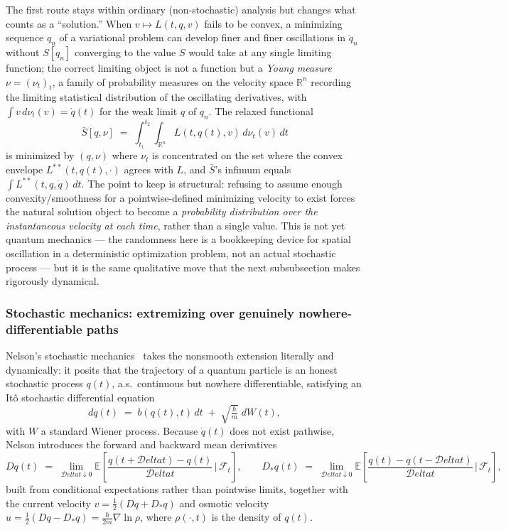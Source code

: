 The first route stays within ordinary (non-stochastic) analysis but changes
what counts as a ``solution.'' When $v\mapsto L(t,q,v)$ fails to be convex, a
minimizing sequence $q_n$ of a variational problem can develop finer and finer
oscillations in $\dot q_n$ without $S[q_n]$ converging to the value $S$ would
take at any single limiting function; the correct limiting object is not a
function but a \emph{Young measure} $\nu=(\nu_t)_{t}$, a family of probability
measures on the velocity space $\mathbb{R}^n$ recording the limiting
statistical distribution of the oscillating derivatives, with $\int
v\,d\nu_t(v)=\dot q(t)$ for the weak limit $q$ of $q_n$. The relaxed functional
\[
\bar S[q,\nu] \;=\; \int_{t_1}^{t_2}\!\!
\int_{\mathbb{R}^n} L(t,q(t),v)\, d\nu_t(v)\, dt
\]
is minimized by $(q,\nu)$ where $\nu_t$ is concentrated on the set where the
convex envelope $L^{\ast\ast}(t,q(t),\cdot)$ agrees with $L$, and $\bar S$'s
infimum equals $\int L^{\ast\ast}(t,q,\dot q)\,dt$. The point to keep is
structural: refusing to assume enough convexity/smoothness for a
pointwise-defined minimizing velocity to exist forces the natural solution
object to become a \emph{probability distribution over the instantaneous
velocity at each time}, rather than a single value. This is not yet quantum
mechanics --- the randomness here is a bookkeeping device for spatial
oscillation in a deterministic optimization problem, not an actual stochastic
process --- but it is the same qualitative move that the next subsubsection
makes rigorously dynamical.

\subsubsection{Stochastic mechanics: extremizing over genuinely nowhere-differentiable paths}
\label{subnelson}

Nelson's stochastic mechanics~\cite{Nelson1966} takes the nonsmooth extension
literally and dynamically: it posits that the trajectory of a quantum particle
is an honest stochastic process $q(t)$, a.s.\ continuous but nowhere
differentiable, satisfying an It\^o stochastic differential equation
\[
dq(t) \;=\; b(q(t),t)\,dt \;+\; \sqrt{\tfrac{\hbar}{m}}\; dW(t),
\]
with $W$ a standard Wiener process. Because $\dot q(t)$ does not exist
pathwise, Nelson introduces the forward and backward mean derivatives
\[
Dq(t) \;=\; \lim_{\mathcal{D}elta t\downarrow 0} 
\mathbb{E}\!\left[\frac{q(t+\mathcal{D}elta t)-
q(t)}{\mathcal{D}elta t}\,\Big|\,\mathcal F_t\right], 
\qquad D_\ast q(t) \;=\; \lim_{\mathcal{D}elta t\downarrow 0}
\mathbb{E}\!\left[\frac{q(t)-q(t-\mathcal{D}elta t)}
{\mathcal{D}elta t}\,\Big|\,\mathcal F_t\right],
\]
built from conditional expectations rather than pointwise limits, together with
the current velocity $v=\tfrac12(Dq+D_\ast q)$ and osmotic velocity
$u=\tfrac12(Dq-D_\ast q)=\tfrac{\hbar}{2m}\nabla\ln\rho$, where $\rho(\cdot,t)$
is the density of $q(t)$.

